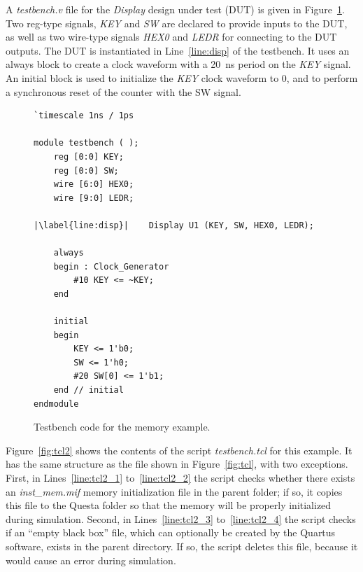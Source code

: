 \documentclass[11pt, twoside, pdftex]{article}
\begin{document}
\noindent
A {\it testbench.v} file for the {\it Display} design under test (DUT) is given in 
Figure~\ref{fig:tb3}. Two reg-type signals, {\it KEY} and {\it SW} are declared to provide 
inputs to the DUT, as well as two wire-type signals {\it HEX0} and {\it LEDR}
for connecting to the DUT outputs. The DUT is instantiated in Line~\ref{line:disp} of 
the testbench. It 
uses an always block to create a clock waveform with a 20~ns period on the {\it KEY} signal. An 
initial block is used to initialize the {\it KEY} clock waveform to 0, and to perform a synchronous 
reset of the counter with the SW signal. 

\lstset{language=Verilog,numbers=left,escapechar=|}
\begin{figure}[h]
\begin{center}
\begin{minipage}[t]{12.5 cm}
\begin{lstlisting}[name=testbench3]
`timescale 1ns / 1ps

module testbench ( );
    reg [0:0] KEY;
    reg [0:0] SW;
    wire [6:0] HEX0;
    wire [9:0] LEDR;

|\label{line:disp}|    Display U1 (KEY, SW, HEX0, LEDR);

    always
    begin : Clock_Generator
        #10 KEY <= ~KEY;
    end

    initial
    begin
        KEY <= 1'b0;
        SW <= 1'h0;
        #20 SW[0] <= 1'b1;
    end // initial
endmodule
\end{lstlisting}
\end{minipage}
\caption{Testbench code for the memory example.}
\label{fig:tb3}
\end{center}
\end{figure}

\noindent
Figure~\ref{fig:tcl2} shows the contents of the script {\it testbench.tcl} for this example.
It has the same structure as the file shown in Figure~\ref{fig:tcl}, with two exceptions. 
First, in Lines~\ref{line:tcl2_1} to~\ref{line:tcl2_2} the script checks whether there 
exists an {\it inst\_mem.mif} memory initialization file in the parent folder; if so, 
it copies this file to the Questa folder so that the memory will be properly initialized
during simulation. Second, in Lines~\ref{line:tcl2_3} 
to~\ref{line:tcl2_4} the script checks if an ``empty black box'' file, which can 
optionally be created by the Quartus software, exists in the parent directory. 
If so, the script deletes this file, because it would cause an error during simulation.
\end{document}
